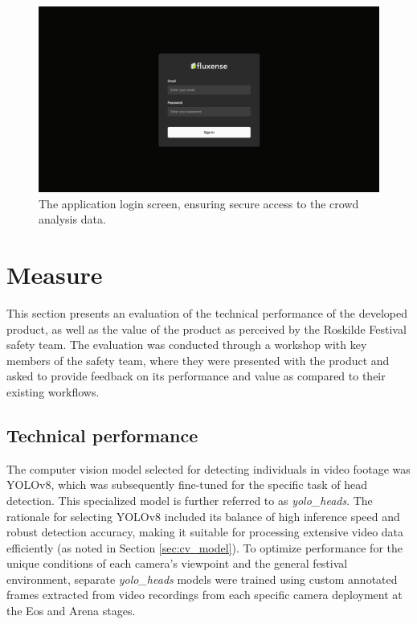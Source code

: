 \begin{figure}[H]
  \centering
  \includegraphics[width=\textwidth]{Pictures/Misc/Frontend/login.png}
  \caption{The application login screen, ensuring secure access to the crowd analysis data.}
  \label{fig:showcase:login}

\end{figure}

\section{Measure}
This section presents an evaluation of the technical performance of the developed product, as well as the value of the product as perceived by the Roskilde Festival safety team. The evaluation was conducted through a workshop with key members of the safety team, where they were presented with the product and asked to provide feedback on its performance and value as compared to their existing workflows.


\subsection{Technical performance}

The computer vision model selected for detecting individuals in video footage was YOLOv8, which was subsequently fine-tuned for the specific task of head detection. This specialized model is further referred to as \textit{yolo\_heads}. The rationale for selecting YOLOv8 included its balance of high inference speed and robust detection accuracy, making it suitable for processing extensive video data efficiently (as noted in Section \ref{sec:cv_model}). To optimize performance for the unique conditions of each camera's viewpoint and the general festival environment, separate \textit{yolo\_heads} models were trained using custom annotated frames extracted from video recordings from each specific camera deployment at the Eos and Arena stages.


